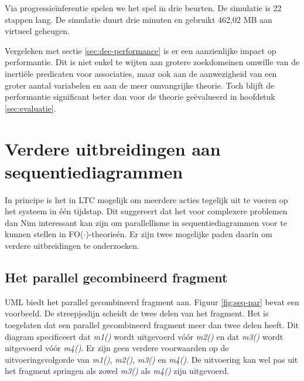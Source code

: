 Via progressie\"inferentie spelen we het spel in drie beurten. De simulatie is 22 stappen lang. De simulatie duurt drie minuten en gebruikt 462,02 MB aan virtueel geheugen.

Vergeleken met sectie \ref{sec:dec-performance} is er een aanzienlijke impact op performantie. Dit is niet enkel te wijten aan grotere zoekdomeinen omwille van de inerti\"ele predicaten voor associaties, maar ook aan de aanwezigheid van een groter aantal variabelen en aan de meer omvangrijke theorie. Toch blijft de performantie significant beter dan voor de theorie ge\"evalueerd in hoofdstuk \ref{sec:evaluatie}.

\section{Verdere uitbreidingen aan sequentiediagrammen}

In principe is het in LTC mogelijk om meerdere acties tegelijk uit te voeren op het systeem in \'e\'en tijdstap. Dit suggereert dat het voor complexere problemen dan Nim interessant kan zijn om parallellisme in sequentiediagrammen voor te kunnen stellen in FO($\cdot$)-theorie\'en. Er zijn twee mogelijke paden daarin om verdere uitbreidingen te onderzoeken.

\subsection{Het parallel gecombineerd fragment}

UML biedt het parallel gecombineerd fragment aan. Figuur \ref{fig:seq-par} bevat een voorbeeld. De streepjeslijn scheidt de twee delen van het fragment. Het is toegelaten dat een parallel gecombineerd fragment meer dan twee delen heeft. Dit diagram specificeert dat \textit{m1()} wordt uitgevoerd v\'o\'or \textit{m2()} en dat \textit{m3()} wordt uitgevoerd v\'o\'or \textit{m4()}. Er zijn geen verdere voorwaarden op de uitvoeringsvolgorde van \textit{m1()}, \textit{m2()}, \textit{m3()} en \textit{m4()}. De uitvoering kan wel pas uit het fragment springen als zowel \textit{m3()} als \textit{m4()} zijn uitgevoerd.

